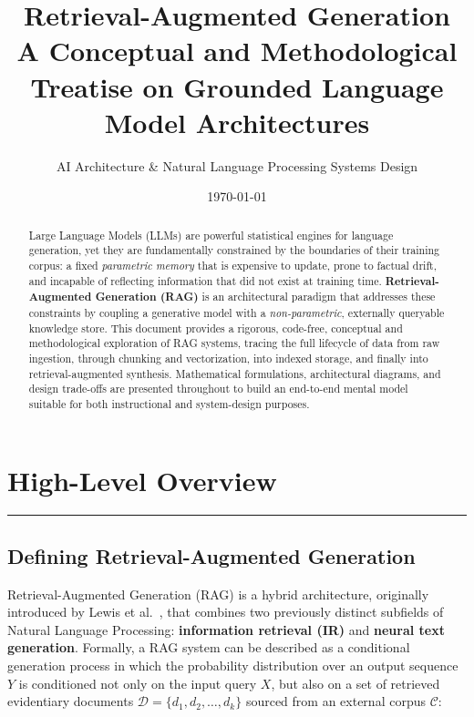 \documentclass[11pt,a4paper]{article}
\title{
  \vspace{-1.5cm}
  {\color{ragblue}\Huge\bfseries Retrieval-Augmented Generation}\\[0.3cm]
  {\Large A Conceptual and Methodological Treatise on Grounded Language Model Architectures}
}
\author{AI Architecture \& Natural Language Processing Systems Design}
\date{\today}
\newcommand{\sectionrule}{\vspace{-0.2cm}\noindent\textcolor{ragblue!40}{\rule{\linewidth}{0.6pt}}\vspace{0.3cm}}
\begin{document}
\maketitle
\thispagestyle{empty}

\begin{abstract}
\noindent
Large Language Models (LLMs) are powerful statistical engines for language generation, yet they are fundamentally constrained by the boundaries of their training corpus: a fixed \emph{parametric memory} that is expensive to update, prone to factual drift, and incapable of reflecting information that did not exist at training time. \textbf{Retrieval-Augmented Generation (RAG)} is an architectural paradigm that addresses these constraints by coupling a generative model with a \emph{non-parametric}, externally queryable knowledge store. This document provides a rigorous, code-free, conceptual and methodological exploration of RAG systems, tracing the full lifecycle of data from raw ingestion, through chunking and vectorization, into indexed storage, and finally into retrieval-augmented synthesis. Mathematical formulations, architectural diagrams, and design trade-offs are presented throughout to build an end-to-end mental model suitable for both instructional and system-design purposes.
\end{abstract}

\vspace{0.5cm}
\tableofcontents
\newpage

\section{High-Level Overview}
\sectionrule

\subsection{Defining Retrieval-Augmented Generation}

Retrieval-Augmented Generation (RAG) is a hybrid architecture, originally introduced by Lewis et al.~\cite{lewis2020rag}, that combines two previously distinct subfields of Natural Language Processing: \textbf{information retrieval (IR)} and \textbf{neural text generation}. Formally, a RAG system can be described as a conditional generation process in which the probability distribution over an output sequence $Y$ is conditioned not only on the input query $X$, but also on a set of retrieved evidentiary documents $\mathcal{D} = \{d_1, d_2, \dots, d_k\}$ sourced from an external corpus $\mathcal{C}$:
\end{document}
